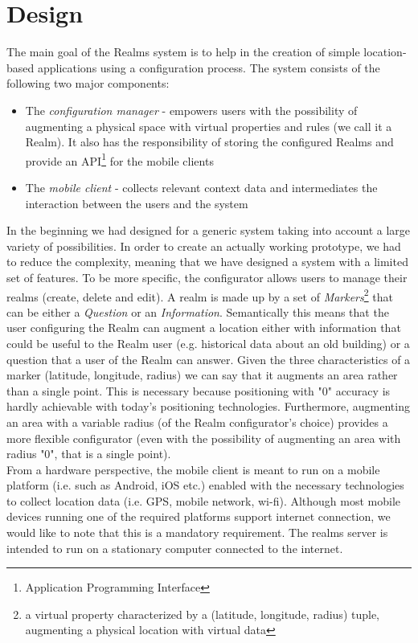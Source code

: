 \section{Design} %
\label{sec:design}
The main goal of the Realms system is to help in the creation of simple location-based applications using a configuration process. The system consists of the following two major components:
\begin{itemize}
	\item The \emph{configuration manager} - empowers users with the possibility of augmenting a physical space with virtual properties and rules (we call it a Realm). It also has the responsibility of storing the configured Realms and provide an API\footnote{Application Programming Interface} for the mobile clients
	\item The \emph{mobile client} - collects relevant context data and intermediates the interaction between the users and the system
\end{itemize}

\noindent In the beginning we had designed for a generic system taking into account a large variety of possibilities. In order to create an actually working prototype, we had to reduce the complexity, meaning that we have designed a system with a limited set of features. To be more specific, the configurator allows users to manage their realms (create, delete and edit). A realm is made up by a set of \emph{Markers}\footnote{a virtual property characterized by a (latitude, longitude, radius) tuple, augmenting a physical location with virtual data} that can be either a \emph{Question} or an \emph{Information}. Semantically this means that the user configuring the Realm can augment a location either with information that could be useful to the Realm user (e.g. historical data about an old building)  or a question that a user of the Realm can answer. Given the three characteristics of a marker (latitude, longitude, radius) we can say that it augments an area rather than a single point. This is necessary because positioning with "0" accuracy is hardly achievable with today's positioning technologies. Furthermore, augmenting an area with a variable radius (of the Realm configurator's choice) provides a more flexible configurator (even with the possibility of augmenting an area with radius "0", that is a single point).
\\

\noindent From a hardware perspective, the mobile client is meant to run on a mobile platform (i.e. such as Android, iOS etc.) enabled with the necessary technologies to collect location data (i.e. GPS, mobile network, wi-fi). Although most mobile devices running one of the required platforms support internet connection, we would like to note that this is a mandatory requirement. The realms server is intended to run on a stationary computer connected to the internet.
\\

